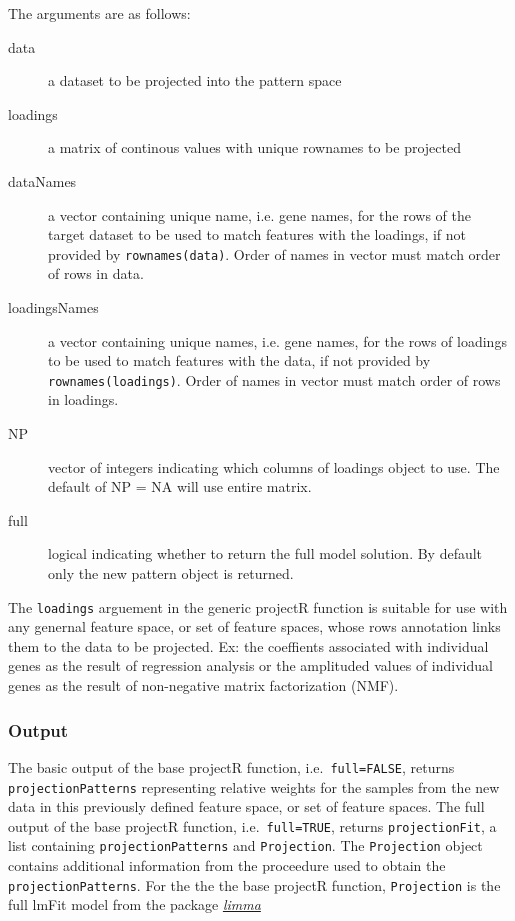 \documentclass[]{article}
\begin{document}
The arguments are as follows:

\begin{description}
\item[data]{a dataset to be projected into the pattern space}
\item[loadings]{a matrix of continous values with unique rownames to be projected}
\item[dataNames]{a vector containing unique name, i.e. gene names, for the rows of the target dataset to be used to match features with the loadings, if not provided by \texttt{rownames(data)}. Order of names in vector must match order of rows in data.}
\item[loadingsNames]{a vector containing unique names, i.e. gene names, for the rows of loadings to be used to match features with the data, if not provided by \texttt{rownames(loadings)}. Order of names in vector must match order of rows in loadings.}
\item[NP]{vector of integers indicating which columns of loadings object to use. The default of NP = NA will use entire matrix.}
\item[full]{logical indicating whether to return the full model solution. By default only the new pattern object is returned.}
\end{description}

The \texttt{loadings} arguement in the generic projectR function is suitable for use with any genernal feature space, or set of feature spaces, whose rows annotation links them to the data to be projected. Ex: the coeffients associated with individual genes as the result of regression analysis or the amplituded values of individual genes as the result of non-negative matrix factorization (NMF).

\hypertarget{output}{%
\subsubsection{Output}\label{output}}

The basic output of the base projectR function, i.e.~\texttt{full=FALSE}, returns \texttt{projectionPatterns} representing relative weights for the samples from the new data in this previously defined feature space, or set of feature spaces. The full output of the base projectR function, i.e.~\texttt{full=TRUE}, returns \texttt{projectionFit}, a list containing \texttt{projectionPatterns} and \texttt{Projection}. The \texttt{Projection} object contains additional information from the proceedure used to obtain the \texttt{projectionPatterns}. For the the the base projectR function, \texttt{Projection} is the full lmFit model from the package \emph{\href{https://bioconductor.org/packages/3.9/limma}{limma}}
\end{document}
